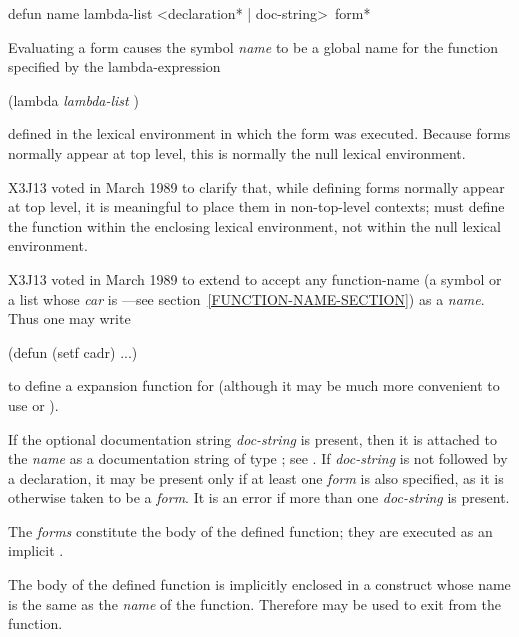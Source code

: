 \begin{defmac}
defun name lambda-list <{declaration}* | doc-string> {\,form}*

Evaluating a  form causes the symbol \emph{name} to be a global name
for the function specified by the lambda-expression
\begin{lisp}
(lambda \emph{lambda-list}  )
\end{lisp}
defined in the lexical environment in which the  form was
executed.  Because  forms normally appear at top level, this is
normally the null lexical environment.

\begin{newer}
X3J13 voted in March 1989 
to clarify that, while defining forms normally appear at top level,
it is meaningful to place them in non-top-level contexts;
 must define the function
within the enclosing lexical environment, not within the null lexical
environment.
\end{newer}

\begin{newer}
X3J13 voted in March 1989  to extend 
to accept any function-name (a symbol or a list
whose \emph{car} is ---see section~\ref{FUNCTION-NAME-SECTION})
as a \emph{name}.
Thus one may write
\begin{lisp}
(defun (setf cadr) ...)
\end{lisp}
to define a 
expansion function for  
(although it may be much more convenient to
use  or ).
\end{newer}

\newpage%

If the optional documentation string \emph{doc-string} is present,
then it is attached to the \emph{name}
as a documentation string of type ; see .
If \emph{doc-string} is not
followed by a declaration, it may be
present only if at least one \emph{form} is also specified, as it is
otherwise taken to be a \emph{form}.
It is an error if more than one \emph{doc-string} is present.

The \emph{forms} constitute the body of the defined function; they are
executed as an implicit .

The body of the defined function is implicitly enclosed
in a  construct whose name is the same as the \emph{name}
of the function.  Therefore 
may be used to exit from the function.


\end{defmac}
